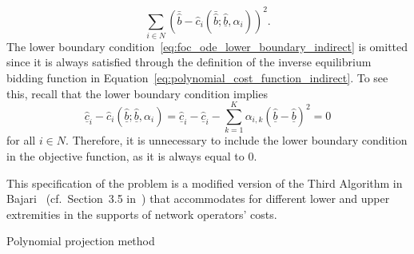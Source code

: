 \begin{equation*}
  \sum_{i\in N} (\bar{\hat{b}} - \hat{c}_i(\bar{\hat{b}}; \underline{\hat{b}}, \alpha_i))^2.
\end{equation*}
The lower boundary condition~\eqref{eq:foc_ode_lower_boundary_indirect} is omitted since it is always satisfied through the definition of the inverse equilibrium bidding function in Equation~\eqref{eq:polynomial_cost_function_indirect}. To see this, recall that the lower boundary condition implies
\begin{equation*}
  \underline{\hat{c}}_i - \hat{c}_i(\underline{\hat{b}}; \underline{\hat{b}}, \alpha_i) = \underline{\hat{c}}_i - \underline{\hat{c}}_i -\sum_{k=1}^K \alpha_{i,k} (\underline{\hat{b}} - \underline{\hat{b}})^2 = 0
\end{equation*}
for all $i\in N$. Therefore, it is unnecessary to include the lower boundary condition in the objective function, as it is always equal to $0$.

This specification of the problem is a modified version of the Third Algorithm in Bajari~\cite{Bajari2001a} (cf.~Section~3.5 in~\cite{Bajari2001a}) that accommodates for different lower and upper extremities in the supports of network operators' costs.

\begin{algorithm}
\caption{Polynomial projection method}
\label{alg:polynomial_projection_method_indirect}
\begin{algorithmic}[1]
  \Statex
  \EndFor
  \Statex
  \Repeat
    \EndFor
\end{algorithmic}
\end{algorithm}

